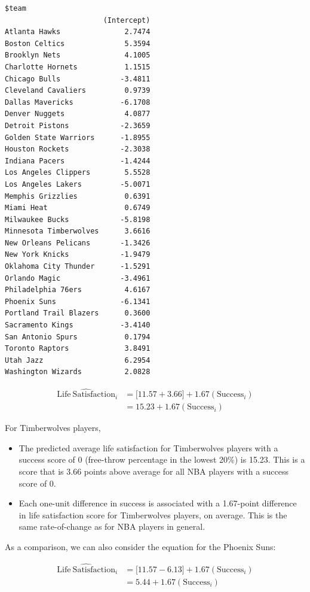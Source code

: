 \documentclass[]{book}
\providecommand{\tightlist}{%
  \setlength{\itemsep}{0pt}\setlength{\parskip}{0pt}}
\begin{document}
\begin{verbatim}
$team
                       (Intercept)
Atlanta Hawks               2.7474
Boston Celtics              5.3594
Brooklyn Nets               4.1005
Charlotte Hornets           1.1515
Chicago Bulls              -3.4811
Cleveland Cavaliers         0.9739
Dallas Mavericks           -6.1708
Denver Nuggets              4.0877
Detroit Pistons            -2.3659
Golden State Warriors      -1.8955
Houston Rockets            -2.3038
Indiana Pacers             -1.4244
Los Angeles Clippers        5.5528
Los Angeles Lakers         -5.0071
Memphis Grizzlies           0.6391
Miami Heat                  0.6749
Milwaukee Bucks            -5.8198
Minnesota Timberwolves      3.6616
New Orleans Pelicans       -1.3426
New York Knicks            -1.9479
Oklahoma City Thunder      -1.5291
Orlando Magic              -3.4961
Philadelphia 76ers          4.6167
Phoenix Suns               -6.1341
Portland Trail Blazers      0.3600
Sacramento Kings           -3.4140
San Antonio Spurs           0.1794
Toronto Raptors             3.8491
Utah Jazz                   6.2954
Washington Wizards          2.0828
\end{verbatim}

\[
\begin{split}
\hat{\mathrm{Life~Satisfaction}}_{i} &= \bigg[11.57 + 3.66 \bigg] + 1.67(\mathrm{Success}_{i}) \\[1ex]
&= 15.23 + 1.67(\mathrm{Success}_{i})
\end{split}
\]

For Timberwolves players,

\begin{itemize}
\tightlist
\item
  The predicted average life satisfaction for Timberwolves players with a success score of 0 (free-throw percentage in the lowest 20\%) is 15.23. This is a score that is 3.66 points above average for all NBA players with a success score of 0.
\item
  Each one-unit difference in success is associated with a 1.67-point difference in life satisfaction score for Timberwolves players, on average. This is the same rate-of-change as for NBA players in general.
\end{itemize}

As a comparison, we can also consider the equation for the Phoenix Suns:

\[
\begin{split}
\hat{\mathrm{Life~Satisfaction}}_{i} &= \bigg[11.57 - 6.13 \bigg] + 1.67(\mathrm{Success}_{i}) \\[1ex]
&= 5.44 + 1.67(\mathrm{Success}_{i})
\end{split}
\]
\end{document}
